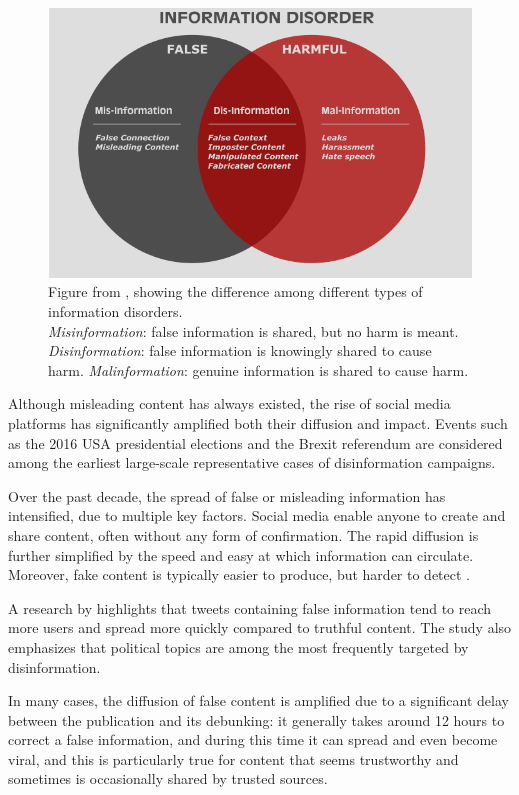 \begin{figure}[h]
    \centering
    \includegraphics[width=0.5\linewidth]{Images/information_disorder_Wardle.png}
    \caption{Figure from \cite{wardle2017information}, showing the difference among different types of information disorders.\\
    \textit{Misinformation}: false information is shared, but no harm is meant. \textit{Disinformation}: false information is knowingly shared to cause harm. \textit{Malinformation}: genuine information is shared to cause harm.}
    \label{fig:info_disorder}
\end{figure}


Although misleading content has always existed, the rise of social media platforms has significantly amplified both their diffusion and impact. 
Events such as the 2016 USA presidential elections and the Brexit referendum are considered among the earliest large-scale representative cases of disinformation campaigns.

Over the past decade, the spread of false or misleading information has intensified, due to multiple key factors.
Social media enable anyone to create and share content, often without any form of confirmation. The rapid diffusion is further simplified by the speed and easy at which information can circulate.
Moreover, fake content is typically easier to produce, but harder to detect \cite{aimeur2023fake}. 

\medskip
A research by \citet{kumar2018falseinformationwebsocial} highlights that tweets containing false information tend to reach more users and spread more quickly compared to truthful content. The study also emphasizes that political topics are among the most frequently targeted by disinformation.

In many cases, the diffusion of false content is amplified due to a significant delay between the publication and its debunking: it generally takes around 12 hours to correct a false information, and during this time it can spread and even become viral, and this is particularly true for content that seems trustworthy and sometimes is occasionally shared by trusted sources.

